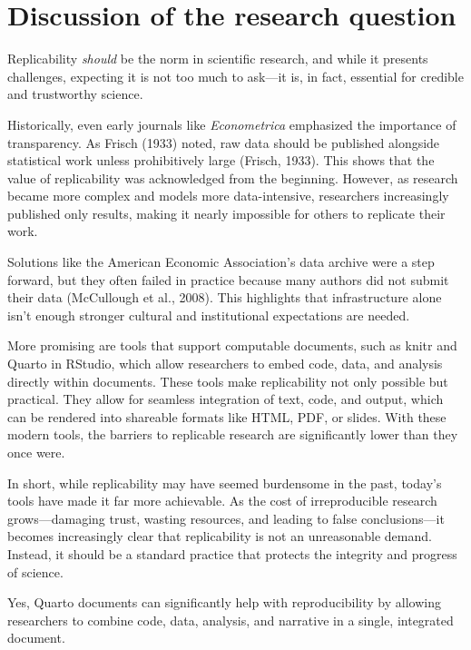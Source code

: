 \documentclass[
  british,
  a4paper,
]{article}
\begin{document}
\section{Discussion of the research
question}\label{discussion-of-the-research-question}

Replicability \emph{should} be the norm in scientific research, and
while it presents challenges, expecting it is not too much to ask---it
is, in fact, essential for credible and trustworthy science.

Historically, even early journals like \emph{Econometrica} emphasized
the importance of transparency. As Frisch (1933) noted, raw data should
be published alongside statistical work unless prohibitively large
(Frisch, 1933). This shows that the value of replicability was
acknowledged from the beginning. However, as research became more
complex and models more data-intensive, researchers increasingly
published only results, making it nearly impossible for others to
replicate their work.

Solutions like the American Economic Association's data archive were a
step forward, but they often failed in practice because many authors did
not submit their data (McCullough et al., 2008). This highlights that
infrastructure alone isn't enough stronger cultural and institutional
expectations are needed.

More promising are tools that support computable documents, such as
knitr and Quarto in RStudio, which allow researchers to embed code,
data, and analysis directly within documents. These tools make
replicability not only possible but practical. They allow for seamless
integration of text, code, and output, which can be rendered into
shareable formats like HTML, PDF, or slides. With these modern tools,
the barriers to replicable research are significantly lower than they
once were.

In short, while replicability may have seemed burdensome in the past,
today's tools have made it far more achievable. As the cost of
irreproducible research grows---damaging trust, wasting resources, and
leading to false conclusions---it becomes increasingly clear that
replicability is not an unreasonable demand. Instead, it should be a
standard practice that protects the integrity and progress of science.

Yes, Quarto documents can significantly help with reproducibility by
allowing researchers to combine code, data, analysis, and narrative in a
single, integrated document.
\end{document}
